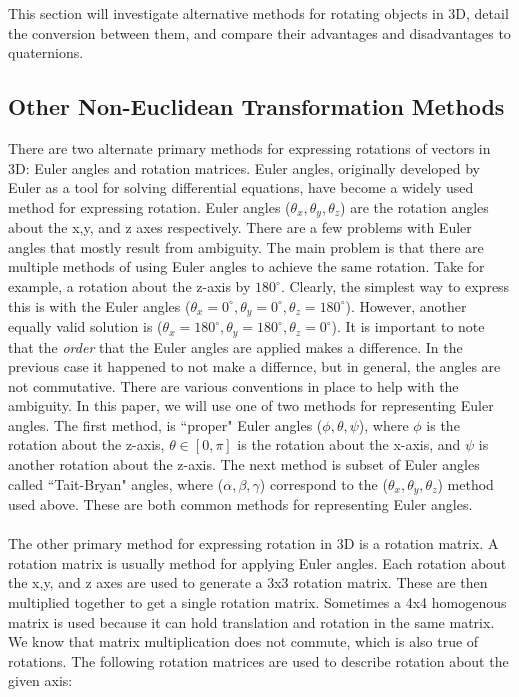 This section will investigate alternative methods for rotating objects in 3D, detail the conversion between them,  and compare their advantages and disadvantages to quaternions.

\subsection{Other Non-Euclidean Transformation Methods}
There are two alternate primary methods for expressing rotations of vectors in 3D: Euler angles and rotation matrices.
Euler angles, originally developed by Euler as a tool for solving differential equations, have become a widely used method for expressing rotation.
Euler angles ($\theta_x, \theta_y, \theta_z$) are the rotation angles about the x,y, and z axes respectively.
There are a few problems with Euler angles that mostly result from ambiguity.
The main problem is that there are multiple methods of using Euler angles to achieve the same rotation.
Take for example, a rotation about the z-axis by $180^\circ$.
Clearly, the simplest way to express this is with the Euler angles ($\theta_x = 0^\circ, \theta_y = 0^\circ, \theta_z = 180^\circ$).
However, another equally valid solution is ($\theta_x = 180^\circ, \theta_y = 180^\circ, \theta_z = 0^\circ$).
It is important to note that the \textit{order} that the Euler angles are applied makes a difference.
In the previous case it happened to not make a differnce, but in general, the angles are not commutative.
There are various conventions in place to help with the ambiguity.
In this paper, we will use one of two methods for representing Euler angles.
The first method, is ``proper" Euler angles ($\phi, \theta, \psi$), where $\phi$ is the rotation about the z-axis, $\theta \in [0, \pi]$ is the rotation about the x-axis, and $\psi$ is another rotation about the z-axis.
The next method is subset of Euler angles called ``Tait-Bryan" angles, where ($\alpha, \beta, \gamma$) correspond to the ($\theta_x, \theta_y, \theta_z$) method used above.
These are both common methods for representing Euler angles.
\\ \\ The other primary method for expressing rotation in 3D is a rotation matrix.
A rotation matrix is usually method for applying Euler angles.
Each rotation about the x,y, and z axes are used to generate a 3x3 rotation matrix.
These are then multiplied together to get a single rotation matrix.
Sometimes a 4x4 homogenous matrix is used because it can hold translation and rotation in the same matrix.
We know that matrix multiplication does not commute, which is also true of rotations.
The following rotation matrices are used to describe rotation about the given axis:

